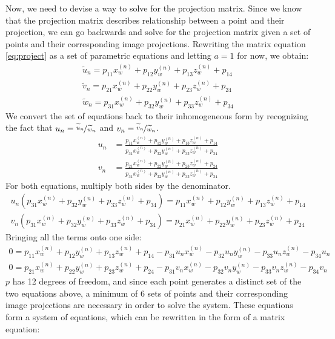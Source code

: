 Now, we need to devise a way to solve for the projection matrix. Since we know that the projection matrix describes relationship between a point and their projection, we can go backwards and solve for the projection matrix given a set of points and their corresponding image projections. Rewriting the matrix equation \ref{eq:project} as a set of parametric equations and letting $a=1$ for now, we obtain:
\begin{align*}
    \widetilde{u}_n = p_{11}x_w^{(n)} + p_{12}y_w^{(n)} + p_{13}z_w^{(n)} + p_{14} \\
    \widetilde{v}_n = p_{21}x_w^{(n)} + p_{22}y_w^{(n)} + p_{23}z_w^{(n)} + p_{24} \\
    \widetilde{w}_n = p_{31}x_w^{(n)} + p_{32}y_w^{(n)} + p_{33}z_w^{(n)} + p_{34}
\end{align*}
We convert the set of equations back to their inhomogeneous form by recognizing the fact that $u_n = \nicefrac{\widetilde{u}_n}{\widetilde{w}_n}$ and $v_n = \nicefrac{\widetilde{v}_n}{\widetilde{w}_n}$. 
\begin{align*}
    u_n & = \frac{p_{11}x_w^{(n)} + p_{12}y_w^{(n)} + p_{13}z_w^{(n)} + p_{14}}{p_{31}x_w^{(n)} + p_{32}y_w^{(n)} + p_{33}z_w^{(n)} + p_{34}} \\
    v_n & = \frac{p_{21}x_w^{(n)} + p_{22}y_w^{(n)} + p_{23}z_w^{(n)} + p_{24}}{p_{31}x_w^{(n)} + p_{32}y_w^{(n)} + p_{33}z_w^{(n)} + p_{34}}
\end{align*}
For both equations, multiply both sides by the denominator.
\begin{align*}
    u_n(p_{31}x_w^{(n)} + p_{32}y_w^{(n)} + p_{33}z_w^{(n)} + p_{34}) = p_{11}x_w^{(n)} + p_{12}y_w^{(n)} + p_{13}z_w^{(n)} + p_{14} \\
    v_n(p_{31}x_w^{(n)} + p_{32}y_w^{ (n)} + p_{33}z_w^{(n)} + p_{34}) = p_{21}x_w^{(n)} + p_{22}y_w^{(n)} + p_{23}z_w^{(n)} + p_{24}
\end{align*}
Bringing all the terms onto one side:
\begin{subequations}
    \begin{align}
        0 = p_{11}x_w^{(n)} + p_{12}y_w^{(n)} + p_{13}z_w^{(n)} + p_{14} - p_{31}u_nx_w^{(n)} - p_{32}u_ny_w^{(n)} - p_{33}u_nz_w^{(n)} - p_{34}u_n \\
        0 = p_{21}x_w^{(n)} + p_{22}y_w^{(n)} + p_{23}z_w^{(n)} + p_{24} - p_{31}v_nx_w^{(n)} - p_{32}v_ny_w^{(n)} - p_{33}v_nz_w^{(n)} - p_{34}v_n
    \end{align}
\end{subequations}
$p$ has 12 degrees of freedom, and since each point generates a distinct set of the two equations above, a minimum of 6 sets of points and their corresponding image projections are necessary in order to solve the system. These equations form a system of equations, which can be rewritten in the form of a matrix equation:
